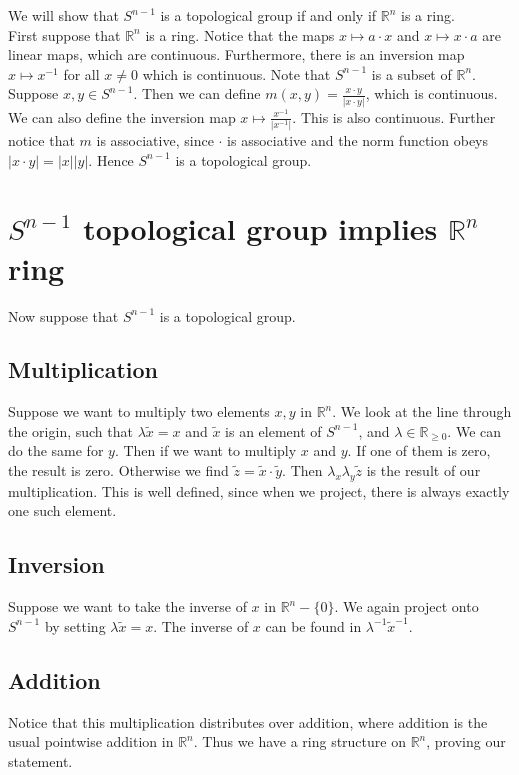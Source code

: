 \documentclass[../Thesis.tex]{subfiles}
\begin{document}
We will show that $S^{n-1}$ is a topological group if and only if $\mathbb{R}^n$ is a ring. 
\\First suppose that $\mathbb{R}^n$ is a ring. Notice that the maps $x \mapsto a\cdot x$ and $x \mapsto x \cdot a$ are linear maps, which are continuous. Furthermore, there is an inversion map $x \mapsto x^{-1}$ for all $x \neq 0$ which is continuous. Note that $S^{n-1}$ is a subset of $\mathbb{R}^n$. Suppose $x,y \in S^{n-1}$. Then we can define $m(x,y) = \frac{x\cdot y}{|x \cdot y|}$, which is continuous. We can also define the inversion map $x \mapsto \frac{x^{-1}}{|x^{-1}|}$. This is also continuous. Further notice that $m$ is associative, since $\cdot$ is associative and the norm function obeys $|x\cdot y| = |x||y|$. Hence $S^{n-1}$ is a topological group.
\section{$S^{n-1}$ topological group implies $\mathbb{R}^n$ ring}
Now suppose that $S^{n-1}$ is a topological group. 
\subsection{Multiplication}
Suppose we want to multiply two elements $x,y$ in $\mathbb{R}^n$. We look at the line through the origin, such that $\lambda \tilde{x} = x$ and $\tilde{x}$ is an element of $S^{n-1}$, and $\lambda \in \mathbb{R}_{\geq 0}$. We can do the same for $y$. Then if we want to multiply $x$ and $y$. If one of them is zero, the result is zero. Otherwise we find $\tilde{z} = \tilde{x}\cdot \tilde{y}$. Then $\lambda_x\lambda_y \tilde{z}$ is the result of our multiplication. This is well defined, since when we project, there is always exactly one such element. 
\subsection{Inversion}
Suppose we want to take the inverse of $x$ in $\mathbb{R}^n - \{0\}$. We again project onto $S^{n-1}$ by setting $\lambda \tilde{x} = x$. The inverse of $x$ can be found in $\lambda^{-1} \tilde{x}^ {-1}$.
\subsection{Addition}
Notice that this multiplication distributes over addition, where addition is the usual pointwise addition in $\mathbb{R}^n$. Thus we have a ring structure on $\mathbb{R}^n$, proving our statement.
\end{document}
